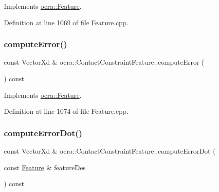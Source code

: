 Implements \hyperlink{classocra_1_1Feature_aaa74d6869f7e574fcc39d443581ddf77}{ocra\+::\+Feature}.



Definition at line 1069 of file Feature.\+cpp.

\hypertarget{classocra_1_1ContactConstraintFeature_ae846fba34c59502db6cf0a0dac0e6be3}{}\label{classocra_1_1ContactConstraintFeature_ae846fba34c59502db6cf0a0dac0e6be3} 
\subsubsection{\texorpdfstring{compute\+Error()}{computeError()}\hspace{0.1cm}{\footnotesize\ttfamily [2/2]}}
{\footnotesize\ttfamily const Vector\+Xd \& ocra\+::\+Contact\+Constraint\+Feature\+::compute\+Error (\begin{DoxyParamCaption}{ }\end{DoxyParamCaption}) const\hspace{0.3cm}{\ttfamily [virtual]}}



Implements \hyperlink{classocra_1_1Feature_a88f87b496aedc7bf9f13b19bb8f9c7fa}{ocra\+::\+Feature}.



Definition at line 1074 of file Feature.\+cpp.

\hypertarget{classocra_1_1ContactConstraintFeature_a0be2debba15230d160957c15eb5afa97}{}\label{classocra_1_1ContactConstraintFeature_a0be2debba15230d160957c15eb5afa97} 
\subsubsection{\texorpdfstring{compute\+Error\+Dot()}{computeErrorDot()}\hspace{0.1cm}{\footnotesize\ttfamily [1/2]}}
{\footnotesize\ttfamily const Vector\+Xd \& ocra\+::\+Contact\+Constraint\+Feature\+::compute\+Error\+Dot (\begin{DoxyParamCaption}\item[{const \hyperlink{classocra_1_1Feature}{Feature} \&}]{feature\+Des }\end{DoxyParamCaption}) const\hspace{0.3cm}{\ttfamily [virtual]}}



